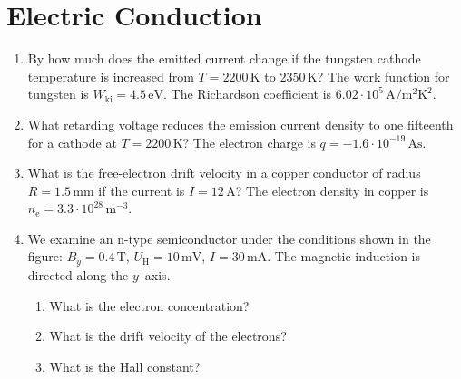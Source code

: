 \documentclass[a4paper,12pt]{article}
\begin{document}
\section*{Electric Conduction}

\begin{enumerate}
  \item By how much does the emitted current change if the tungsten cathode temperature is increased from $T = 2200\,\text{K}$ to $2350\,\text{K}$?  
  The work function for tungsten is $W_{\text{ki}} = 4.5\,\text{eV}$.  
  The Richardson coefficient is $6.02 \cdot 10^{5}\,\text{A}/\text{m}^2\text{K}^2$.

  \item What retarding voltage reduces the emission current density to one fifteenth for a cathode at $T = 2200\,\text{K}$?  
  The electron charge is $q = -1.6 \cdot 10^{-19}\,\text{As}$.

  \item What is the free-electron drift velocity in a copper conductor of radius $R = 1.5\,\text{mm}$ if the current is $I = 12\,\text{A}$?  
  The electron density in copper is $n_{\text{e}} = 3.3 \cdot 10^{28}\,\text{m}^{-3}$.

  \item We examine an n-type semiconductor under the conditions shown in the figure:  
  $B_{y} = 0.4\,\text{T}$, $U_{\text{H}} = 10\,\text{mV}$, $I = 30\,\text{mA}$.  
  The magnetic induction is directed along the $y$–axis.

  \begin{enumerate}
    \item What is the electron concentration?
    \item What is the drift velocity of the electrons?
    \item What is the Hall constant?
  \end{enumerate}

\end{enumerate}
\end{document}
